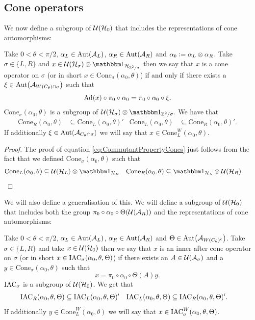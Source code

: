 \documentclass[12pt,a4paper,twoside]{article}
\numberwithin{equation}{section}
\begin{document}
\subsection{Cone operators}
 We now define a subgroup of $\mathcal U(\mathcal H_0)$ that includes the representations of cone automorphisms:
\begin{definition}\label{def:ConeOperators}
	Take $0<\theta<\pi/2$, $\alpha_L\in\Aut{\AA_{L}}$, $\alpha_R\in\Aut{\AA_{R}}$ and $\alpha_0\vcentcolon= \alpha_L\otimes\alpha_R$. Take $\sigma\in\{L,R\}$ and $x\in\UU(\HH_{\sigma})\otimes\id_{\HH_{\ZZ^2/\sigma}}$ then we say that $x$ is a cone operator on $\sigma$ (or in short $x\in\textrm{Cone}_{\sigma}(\alpha_0,\theta)$) if and only if there exists a $\xi\in\Aut{\AA_{W(C_\theta)\cap\sigma}}$ such that
	\begin{equation}
		\Ad{x}\circ\pi_0\circ\alpha_0=\pi_0\circ\alpha_0\circ\xi.
	\end{equation}
	$\textrm{Cone}_\sigma(\alpha_0,\theta)$ is a subgroup of $\UU(\HH_\sigma)\otimes\id_{\ZZ^2/\sigma}$. We have that
	\begin{align}\label{eq:CommutantPropertyCones}
		\textrm{Cone}_R(\alpha_0,\theta)&\subseteq\textrm{Cone}_L(\alpha_0,\theta)'&\textrm{Cone}_L(\alpha_0,\theta)&\subseteq\textrm{Cone}_R(\alpha_0,\theta)'.
	\end{align}
	If additionally $\xi\in\Aut{\AA_{C_\theta\cap\sigma}}$ we will say that $x\in\textrm{Cone}_L^W(\alpha_0,\theta)$.
\end{definition}
\begin{proof}
	The proof of equation \eqref{eq:CommutantPropertyCones} just follows from the fact that we defined $\textrm{Cone}_\sigma(\alpha_0,\theta)$ such that
	\begin{align}
		\textrm{Cone}_L(\alpha_0,\theta)&\subseteq \UU(\HH_L)\otimes\id_{\HH_R}&\textrm{Cone}_R(\alpha_0,\theta)&\subseteq \id_{\HH_L} \otimes \UU(\HH_R).
	\end{align}
\end{proof}
We will also define a generalisation of this. We will define a subgroup of $\mathcal U(\mathcal H_0)$ that includes both the group $\pi_0\circ\alpha_0\circ\Theta(\mathcal U(\mathcal A_R))$ and the representations of cone automorphisms:
\begin{definition}
	Take $0<\theta<\pi/2$, $\alpha_L\in\Aut{\AA_{L}}$, $\alpha_R\in\Aut{\AA_{R}}$ and $\Theta\in\Aut{\AA_{W(C_\theta)^c}}$. Take $\sigma\in\{L,R\}$ and take $x\in\mathcal U(\mathcal H_0)$ then we say that $x$ is an inner after cone operator on $\sigma$ (or in short $x\in \textrm{IAC}_\sigma(\alpha_0,\theta,\Theta)$) if there exists an $A\in\mathcal U(\mathcal A_\sigma)$ and a $y\in\textrm{Cone}_\sigma(\alpha_0,\theta)$ such that
	\begin{equation}
		x=\pi_0\circ\alpha_0\circ\Theta(A)y.
	\end{equation}
	$\textrm{IAC}_\sigma$ is a subgroup of $\mathcal U(\mathcal H_0)$. We get that
	\begin{align}\label{eq:CommutantProperty}
		\textrm{IAC}_R(\alpha_0,\theta,\Theta)&\subseteq\textrm{IAC}_L(\alpha_0,\theta,\Theta)'&\textrm{IAC}_L(\alpha_0,\theta,\Theta)&\subseteq\textrm{IAC}_R(\alpha_0,\theta,\Theta)'.
	\end{align}
	If additionally $y\in \textrm{Cone}_L^W(\alpha_0,\theta)$ we will say that $x\in \textrm{IAC}_\sigma^W(\alpha_0,\theta,\Theta)$.
\end{definition}
\end{document}
